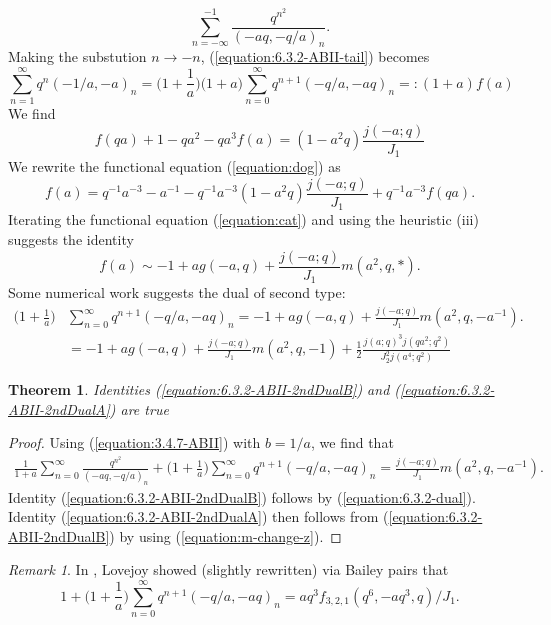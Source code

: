 \documentclass[12pt,reqno]{amsart}
\newtheorem{theorem}{Theorem}
\theoremstyle{remark}
\newtheorem*{remark}{Remark}
\theoremstyle{definition}
\numberwithin{theorem}{section} \numberwithin{equation}{section}
\numberwithin{example}{section}
\begin{document}
{\begin{equation}
\sum_{n=-\infty}^{-1}\frac{q^{n^2}}{(-aq,-q/a)_n}.\label{equation:6.3.2-ABII-tail}
\end{equation}
Making the substution $n\rightarrow -n$, (\ref{equation:6.3.2-ABII-tail}) becomes
\begin{equation}
\sum_{n=1}^{\infty}q^{n}(-1/a,-a)_n=\Big ( 1+\frac{1}{a}\Big )\Big ( 1+a \Big )\sum_{n=0}^{\infty}q^{n+1}(-q/a,-aq)_n=:(1+a)f(a)\label{equation:6.3.2-ABII-tail-2}
\end{equation}
We find
\begin{equation}
f(qa)+1-qa^2-qa^3f(a)=(1-a^2q)\frac{j(-a;q)}{J_1}\label{equation:dog}
\end{equation}
We rewrite the functional equation (\ref{equation:dog}) as
\begin{equation}
f(a)=q^{-1}a^{-3}-a^{-1}-q^{-1}a^{-3}(1-a^2q)\frac{j(-a;q)}{J_1}+q^{-1}a^{-3}f(qa).\label{equation:cat}
\end{equation}
Iterating the functional equation (\ref{equation:cat}) and using the heuristic (iii) suggests the identity
\begin{equation*}
f(a)\sim-1+ag(-a,q)+\frac{j(-a;q)}{J_1}m(a^2,q,*).
\end{equation*}
Some numerical work suggests the dual of second type:
\begin{align}
\Big ( 1+\frac{1}{a}\Big )&\sum_{n=0}^{\infty}q^{n+1}(-q/a,-aq)_n=-1+ag(-a,q)+\frac{j(-a;q)}{J_1}m(a^2,q,-a^{-1}).\label{equation:6.3.2-ABII-2ndDualB}\\
&=-1+ag(-a,q)+\frac{j(-a;q)}{J_1}m(a^2,q,-1) +\frac{1}{2}\frac{j(a;q)^3j(qa^2;q^2)}{J_2^2j(a^4;q^2)}\label{equation:6.3.2-ABII-2ndDualA}
\end{align}
\begin{theorem} Identities (\ref{equation:6.3.2-ABII-2ndDualB}) and  (\ref{equation:6.3.2-ABII-2ndDualA}) are true
\end{theorem}
\begin{proof}
Using \cite[Entry $3.4.7$]{ABII} (\ref{equation:3.4.7-ABII}) with $b=1/a$, we find that
\begin{align*}
\frac{1}{1+a}\sum_{n=0}^{\infty}\frac{q^{n^2}}{(-aq,-q/a)_n}+\Big ( 1+\frac{1}{a}\Big )\sum_{n=0}^{\infty}q^{n+1}(-q/a,-aq)_n=\frac{j(-a;q)}{J_1}m(a^2,q,-a^{-1}).
\end{align*}
Identity (\ref{equation:6.3.2-ABII-2ndDualB}) follows by (\ref{equation:6.3.2-dual}).  Identity (\ref{equation:6.3.2-ABII-2ndDualA}) then follows from (\ref{equation:6.3.2-ABII-2ndDualB}) by using (\ref{equation:m-change-z}).
\end{proof}
\begin{remark} 
In \cite{L}, Lovejoy showed (slightly rewritten) via Bailey pairs that
\begin{equation}
1+\Big ( 1+\frac{1}{a}\Big )\sum_{n=0}^{\infty}q^{n+1}(-q/a,-aq)_n=aq^3f_{3,2,1}(q^6,-aq^3,q)/J_{1}.
\end{equation}
\end{remark}

}
\end{document}
